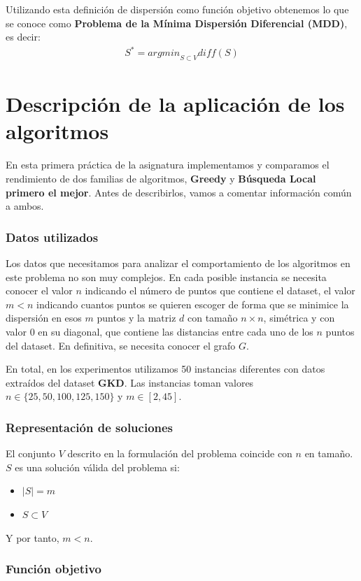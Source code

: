 Utilizando esta definición de dispersión como función objetivo obtenemos lo que se conoce como \textbf{Problema de la Mínima Dispersión Diferencial (MDD)}, es decir: 
\begin{align*}
    S^{*} = {arg min}_{S \subset V} diff(S)
\end{align*}


\part{Descripción de la aplicación de los algoritmos}
En esta primera práctica de la asignatura implementamos y comparamos el rendimiento de dos familias de algoritmos, \textbf{Greedy} y \textbf{Búsqueda Local primero el mejor}. Antes de describirlos, vamos a comentar información común a ambos.


\section{Datos utilizados}
Los datos que necesitamos para analizar el comportamiento de los algoritmos en este problema no son muy complejos. En cada posible instancia se necesita conocer el valor $n$ indicando el número de puntos que contiene el dataset, el valor $m < n$ indicando cuantos puntos se quieren escoger de forma que se minimice la dispersión en esos $m$ puntos y la matriz $d$ con tamaño $n \times n$, simétrica y con valor 0 en su diagonal, que contiene las distancias entre cada uno de los $n$ puntos del dataset. En definitiva, se necesita conocer el grafo $G$.

En total, en los experimentos utilizamos 50 instancias diferentes con datos extraídos del dataset \textbf{GKD}. Las instancias toman valores $n \in \{25,50,100,125,150\}$ y $m \in [2,45]$.


\section{Representación de soluciones}

El conjunto $V$ descrito en la formulación del problema coincide con $n$ en tamaño. $S$ es una solución válida del problema si:
\begin{itemize}
    \item $|S| = m$
    \item $S \subset V$
\end{itemize}
Y por tanto, $m < n$.

\section{Función objetivo}

